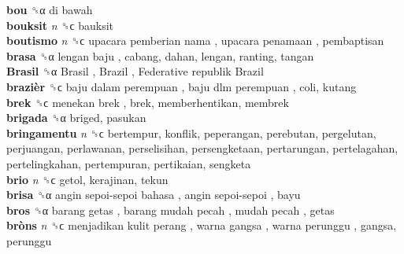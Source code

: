\textbf{bou} ␝α   di bawah   \\
\textbf{bouksit} \emph{n}  ␝ϲ  bauksit  \\
\textbf{boutismo} \emph{n}  ␝ϲ   upacara pemberian nama ,  upacara penamaan , pembaptisan  \\
\textbf{brasa} ␝α   lengan baju , cabang, dahan, lengan, ranting, tangan  \\
\textbf{Brasil} ␝α   Brasil ,  Brazil ,  Federative republik Brazil   \\
\textbf{brazièr} ␝ϲ   baju dalam perempuan ,  baju dlm perempuan , coli, kutang  \\
\textbf{brek} ␝ϲ   menekan brek , brek, memberhentikan, membrek  \\
\textbf{brigada} ␝α  briged, pasukan  \\
\textbf{bringamentu} \emph{n}  ␝ϲ  bertempur, konflik, peperangan, perebutan, pergelutan, perjuangan, perlawanan, perselisihan, persengketaan, pertarungan, pertelagahan, pertelingkahan, pertempuran, pertikaian, sengketa  \\
\textbf{brio} \emph{n}  ␝ϲ  getol, kerajinan, tekun  \\
\textbf{brisa} ␝α   angin sepoi-sepoi bahasa ,  angin sepoi-sepoi , bayu  \\
\textbf{bros} ␝α   barang getas ,  barang mudah pecah ,  mudah pecah , getas  \\
\textbf{bròns} \emph{n}  ␝ϲ   menjadikan kulit perang ,  warna gangsa ,  warna perunggu , gangsa, perunggu  \\
